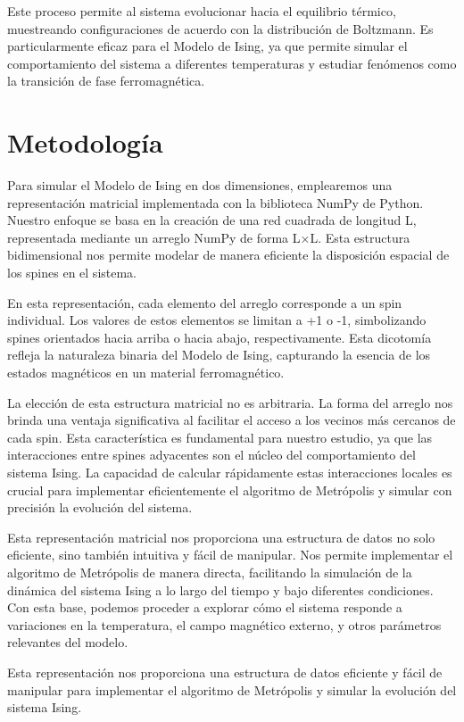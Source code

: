 \documentclass[twocolumn]{article}
\begin{document}
Este proceso permite al sistema evolucionar hacia el equilibrio térmico, muestreando configuraciones de acuerdo con la distribución de Boltzmann. Es particularmente eficaz para el Modelo de Ising, ya que permite simular el comportamiento del sistema a diferentes temperaturas y estudiar fenómenos como la transición de fase ferromagnética.


\section{Metodología}

Para simular el Modelo de Ising en dos dimensiones, emplearemos una representación matricial implementada con la biblioteca NumPy de Python. Nuestro enfoque se basa en la creación de una red cuadrada de longitud L, representada mediante un arreglo NumPy de forma L×L. Esta estructura bidimensional nos permite modelar de manera eficiente la disposición espacial de los spines en el sistema.

En esta representación, cada elemento del arreglo corresponde a un spin individual. Los valores de estos elementos se limitan a +1 o -1, simbolizando spines orientados hacia arriba o hacia abajo, respectivamente. Esta dicotomía refleja la naturaleza binaria del Modelo de Ising, capturando la esencia de los estados magnéticos en un material ferromagnético.

La elección de esta estructura matricial no es arbitraria. La forma del arreglo nos brinda una ventaja significativa al facilitar el acceso a los vecinos más cercanos de cada spin. Esta característica es fundamental para nuestro estudio, ya que las interacciones entre spines adyacentes son el núcleo del comportamiento del sistema Ising. La capacidad de calcular rápidamente estas interacciones locales es crucial para implementar eficientemente el algoritmo de Metrópolis y simular con precisión la evolución del sistema.

Esta representación matricial nos proporciona una estructura de datos no solo eficiente, sino también intuitiva y fácil de manipular. Nos permite implementar el algoritmo de Metrópolis de manera directa, facilitando la simulación de la dinámica del sistema Ising a lo largo del tiempo y bajo diferentes condiciones. Con esta base, podemos proceder a explorar cómo el sistema responde a variaciones en la temperatura, el campo magnético externo, y otros parámetros relevantes del modelo.

Esta representación nos proporciona una estructura de datos eficiente y fácil de manipular para implementar el algoritmo de Metrópolis y simular la evolución del sistema Ising.
\end{document}
